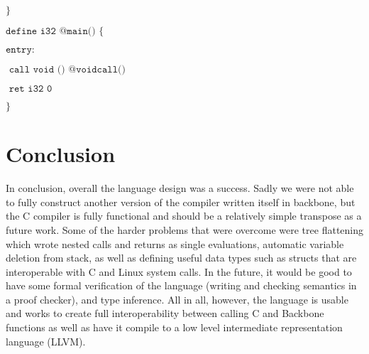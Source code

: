 \documentclass[journal=jacsat, manuscript=article]{achemso}
\begin{document}
$\texttt{\}}$

$\texttt{define i32 @main() \{}$

$\texttt{entry:}$

$\texttt{  call void () @voidcall()}$

$\texttt{  ret i32 0}$

$\texttt{\}}$

\section{Conclusion}

In conclusion, overall the language design was a success. Sadly we were not able to fully construct
another version of the compiler written itself in backbone, but the C compiler is fully functional
and should be a relatively simple transpose as a future work. Some of the harder problems that were overcome
were tree flattening which wrote nested calls and returns as single evaluations, automatic variable
deletion from stack, as well as defining useful data types such as structs that are interoperable
with C and Linux system calls. In the future, it would be good to have some formal verification of the
language (writing and checking semantics in a proof checker), and type inference. All in all, however,
the language is usable and works to create full interoperability between calling C and Backbone functions
as well as have it compile to a low level intermediate representation language (LLVM).
\end{document}
